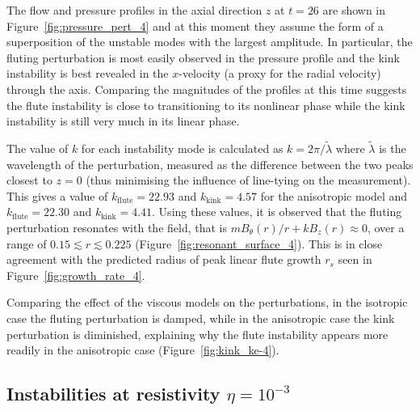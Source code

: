\documentclass[fleqn,usenatbib]{mnras}
\newcommand{\rev}[1]{{\color{red} {#1}}}
\newcommand{\newold}[2]{{#1}{}}
\begin{document}
The \rev{flow and pressure profiles in the axial direction $z$} at
$t=26$ are shown in Figure~\ref{fig:pressure_pert_4} \rev{and at this
moment they assume the form of a superposition of the unstable modes
with the largest amplitude. In particular, the} fluting perturbation
  is most easily observed in the pressure \rev{profile and} \rev{\newold{}{ plotted
  as a function of $z$ following a line through the point $(r, \theta) = (0.101, 0)$.}} \rev{the} kink
instability is best revealed in the $x$-velocity (a proxy for the radial
velocity) through the axis. Comparing the magnitudes of the \rev{profiles} at
this time suggests the flute instability is close to transitioning to its
nonlinear phase while the kink instability is still very much in its linear
phase.

The value of $k$ for each \rev{instability mode} is calculated as $k
= 2\pi/\tilde{\lambda}$ where $\tilde{\lambda}$ is the wavelength of the
perturbation, measured as the difference between the two peaks closest to $z=0$
(thus minimising the influence of line-tying on the measurement). This gives
a value of $k_{\text{flute}}=22.93$ and $k_{\text{kink}}=4.57$ for the
anisotropic model and $k_{\text{flute}}=22.30$ and $k_{\text{kink}}=4.41$.
Using these values, it is observed that the fluting perturbation resonates with
the field, that is $m B_{\theta}(r)/r + kB_z(r) \approx 0$, over a range of
$0.15 \lesssim r \lesssim 0.225$ (Figure~\ref{fig:resonant_surface_4}). This is
in close agreement with the predicted radius of peak linear \rev{flute growth
$r_s$} seen in Figure~\ref{fig:growth_rate_4}.

Comparing the effect of the viscous models on the perturbations, \rev{in the
isotropic case the fluting perturbation is damped}, while in the anisotropic
case the kink perturbation is diminished, explaining why the flute instability
appears more readily in the anisotropic case (Figure~\ref{fig:kink_ke-4}).

\subsection{Instabilities at resistivity $\eta=10^{-3}$}
\end{document}
